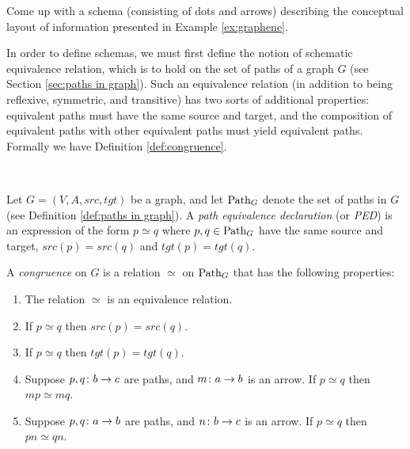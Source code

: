 \documentclass[CT4S-EN-RU]{subfiles}
\begin{document}
\begin{exampleRUS}\label{ex:department store 3}
\end{exampleRUS}

\begin{exerciseENG}\label{exc:schema for first tables}
Come up with a schema (consisting of dots and arrows) describing the conceptual layout of information presented in Example \ref{ex:graphene}. 
\end{exerciseENG}

\begin{exerciseRUS}\label{exc:schema for first tables}
\end{exerciseRUS}

\begin{blockENG}
In order to define schemas, we must first define the notion of schematic equivalence relation, which is to hold on the set of paths of a graph $G$ (see Section \ref{sec:paths in graph}). Such an equivalence relation (in addition to being reflexive, symmetric, and transitive) has two sorts of additional properties: equivalent paths must have the same source and target, and the composition of equivalent paths with other equivalent paths must yield equivalent paths. Formally we have Definition \ref{def:congruence}.
\end{blockENG}

\begin{blockRUS}
\end{blockRUS}

\begin{definitionENG}\label{def:congruence}\

Let $G=(V,A,src,tgt)$ be a graph, and let $\textnormal{Path}_G$ denote the set of paths in $G$ (see Definition \ref{def:paths in graph}). A {\em path equivalence declaration} (or {\em PED}) is an expression of the form $p\simeq q$ where $p,q\in\textnormal{Path}_G$ have the same source and target, $src(p)=src(q)$ and $tgt(p)=tgt(q)$. 

A {\em congruence} on $G$ is a relation $\simeq$ on $\textnormal{Path}_G$ that has the following properties: 
\begin{enumerate}
\item The relation $\simeq$ is an equivalence relation.
\item If $p\simeq q$ then $src(p)=src(q)$.
\item If $p\simeq q$ then $tgt(p)=tgt(q)$.
\item Suppose $p,q\colon b\rightarrow c$ are paths, and $m\colon a\rightarrow b$ is an arrow. If $p\simeq q$ then $mp\simeq mq$. 
\item Suppose $p,q\colon a\rightarrow b$ are paths, and $n\colon b\rightarrow c$ is an arrow. If $p\simeq q$ then $pn\simeq qn$.
\end{enumerate}
\end{definitionENG}
\end{document}
